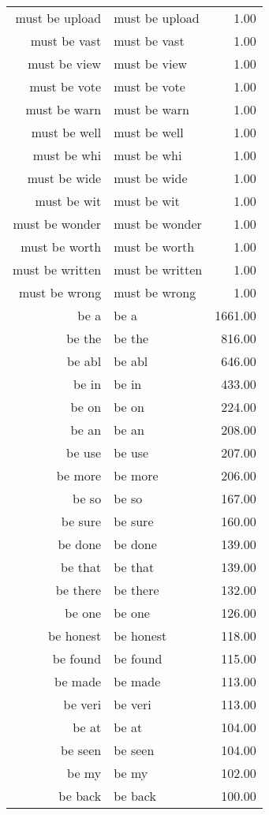 \begin{table}[ht]
\begin{tabular}{rlr}
  must be upload & must be upload & 1.00 \\ 
  must be vast & must be vast & 1.00 \\ 
  must be view & must be view & 1.00 \\ 
  must be vote & must be vote & 1.00 \\ 
  must be warn & must be warn & 1.00 \\ 
  must be well & must be well & 1.00 \\ 
  must be whi & must be whi & 1.00 \\ 
  must be wide & must be wide & 1.00 \\ 
  must be wit & must be wit & 1.00 \\ 
  must be wonder & must be wonder & 1.00 \\ 
  must be worth & must be worth & 1.00 \\ 
  must be written & must be written & 1.00 \\ 
  must be wrong & must be wrong & 1.00 \\ 
  be a & be a & 1661.00 \\ 
  be the & be the & 816.00 \\ 
  be abl & be abl & 646.00 \\ 
  be in & be in & 433.00 \\ 
  be on & be on & 224.00 \\ 
  be an & be an & 208.00 \\ 
  be use & be use & 207.00 \\ 
  be more & be more & 206.00 \\ 
  be so & be so & 167.00 \\ 
  be sure & be sure & 160.00 \\ 
  be done & be done & 139.00 \\ 
  be that & be that & 139.00 \\ 
  be there & be there & 132.00 \\ 
  be one & be one & 126.00 \\ 
  be honest & be honest & 118.00 \\ 
  be found & be found & 115.00 \\ 
  be made & be made & 113.00 \\ 
  be veri & be veri & 113.00 \\ 
  be at & be at & 104.00 \\ 
  be seen & be seen & 104.00 \\ 
  be my & be my & 102.00 \\ 
  be back & be back & 100.00 \\ 

\end{tabular}
\end{table}
